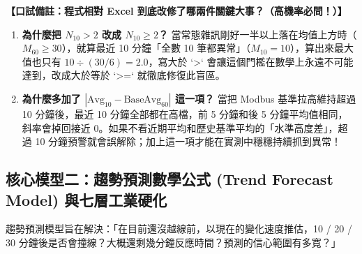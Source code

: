 \documentclass[fontset=none, a4paper, 12pt]{ctexart}
\begin{document}
\begin{doublespace}
\noindent\textbf{【口試備註：程式相對 Excel 到底改修了哪兩件關鍵大事？（高機率必問！）】}\\
\begin{enumerate}
    \item \textbf{為什麼把 $N_{10} > 2$ 改成 $N_{10} \ge 2$？} 當常態雜訊剛好一半以上落在均值上方時（$M_{60} \ge 30$），就算最近 10 分鐘「全數 10 筆都異常」（$M_{10}=10$），算出來最大值也只有 $10 \div (30/6) = 2.0$，寫大於 `>` 會讓這個門檻在數學上永遠不可能達到，改成大於等於 `>=` 就徹底修復此盲區。
    \item \textbf{為什麼多加了 $|\mathrm{Avg}_{10} - \mathrm{BaseAvg}_{60}|$ 這一項？} 當把 Modbus 基準拉高維持超過 10 分鐘後，最近 10 分鐘全部都在高檔，前 5 分鐘和後 5 分鐘平均值相同，斜率會掉回接近 $0$。如果不看近期平均和歷史基準平均的「水準高度差」，超過 10 分鐘預警就會誤解除；加上這一項才能在實測中穩穩持續抓到異常！
\end{enumerate}

\subsection{核心模型二：趨勢預測數學公式 (Trend Forecast Model) 與七層工業硬化}
\label{sec:trend_forecast}
趨勢預測模型旨在解決：「在目前還沒越線前，以現在的變化速度推估，10 / 20 / 30 分鐘後是否會撞線？大概還剩幾分鐘反應時間？預測的信心範圍有多寬？」


\end{doublespace}
\end{document}

